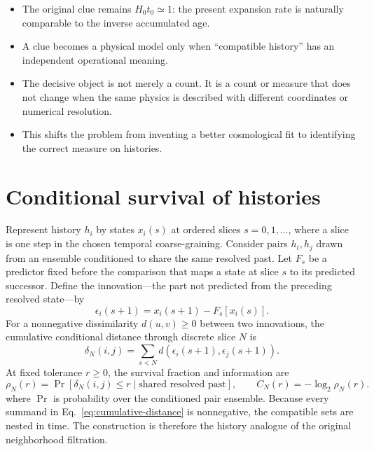 \documentclass[10pt]{article}
\newenvironment{persuasions}
  {\begin{cpbox}\small\setlength{\parskip}{0pt}%
   {\footnotesize\bfseries\color{accent}%
    \textls[110]{CONCEPTUAL PERSUASIONS}}\par\vspace{3pt}%
   \begin{itemize}[leftmargin=1.15em,itemsep=2.5pt,topsep=0pt,parsep=0pt,
                   label=\textcolor{accent}{\scriptsize$\blacktriangleright$}]}
  {\end{itemize}\end{cpbox}}
\begin{document}
\begin{persuasions}
\item The original clue remains $H_0t_0\simeq1$: the present expansion rate is
naturally comparable to the inverse accumulated age.
\item A clue becomes a physical model only when ``compatible history'' has an
independent operational meaning.
\item The decisive object is not merely a count.  It is a count or measure that
does not change when the same physics is described with different coordinates
or numerical resolution.
\item This shifts the problem from inventing a better cosmological fit to
identifying the correct measure on histories.
\end{persuasions}

\section*{Conditional survival of histories}

Represent history $h_i$ by states $x_i(s)$ at ordered slices
$s=0,1,\ldots$, where a slice is one step in the chosen temporal
coarse-graining.  Consider pairs $h_i,h_j$ drawn from an ensemble conditioned
to share the same resolved past.  Let $F_s$ be a predictor fixed before the
comparison that maps a state at slice $s$ to its predicted successor.  Define
the innovation---the part not predicted from the preceding resolved state---by
\begin{equation}
\epsilon_i(s+1)=x_i(s+1)-F_s[x_i(s)].
\label{eq:innovation}
\end{equation}
For a nonnegative dissimilarity $d(u,v)\geq0$ between two innovations, the
cumulative conditional distance through discrete slice $N$ is
\begin{equation}
\delta_N(i,j)=\sum_{s<N}d\!\left(\epsilon_i(s+1),\epsilon_j(s+1)\right).
\label{eq:cumulative-distance}
\end{equation}
At fixed tolerance $r\geq0$, the survival fraction and information are
\begin{equation}
\rho_N(r)=\Pr[\delta_N(i,j)\le r\mid\text{shared resolved past}],
\qquad C_N(r)=-\log_2\rho_N(r).
\label{eq:survival}
\end{equation}
where $\Pr$ is probability over the conditioned pair ensemble.  Because every
summand in Eq.~\eqref{eq:cumulative-distance} is nonnegative,
the compatible sets are nested in time.  The construction is therefore the
history analogue of the original neighborhood filtration.
\end{document}
